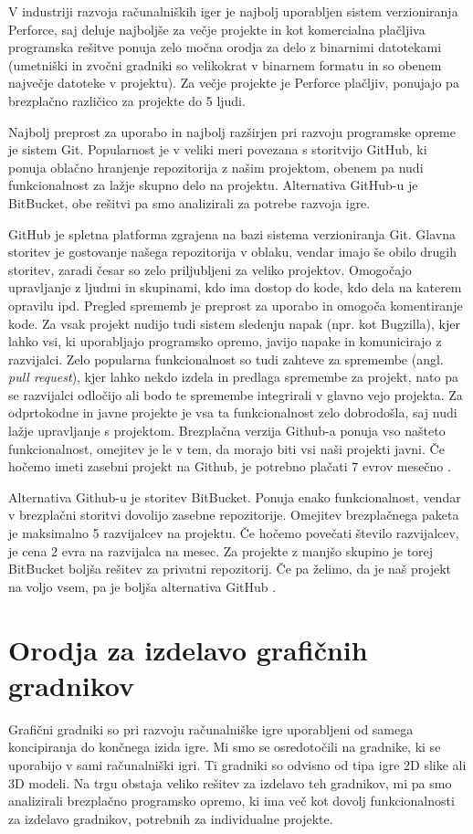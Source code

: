 \documentclass[12pt,a4paper,twoside]{book}
\begin{document}
V industriji razvoja računalniških iger je najbolj uporabljen sistem verzioniranja Perforce, saj deluje najboljše za večje projekte in kot komercialna plačljiva programska rešitve ponuja zelo močna orodja za delo z binarnimi datotekami (umetniški in zvočni gradniki so velikokrat v binarnem formatu in so obenem največje datoteke v projektu). Za večje projekte je Perforce plačljiv, ponujajo pa brezplačno različico za projekte do 5 ljudi.

Najbolj preprost za uporabo in najbolj razširjen pri razvoju programske opreme je sistem Git. Popularnost je v veliki meri povezana s storitvijo GitHub, ki ponuja oblačno hranjenje repozitorija z našim projektom, obenem pa nudi funkcionalnost za lažje skupno delo na projektu. Alternativa GitHub-u je BitBucket, obe rešitvi pa smo analizirali za potrebe razvoja igre.

GitHub je spletna platforma zgrajena na bazi sistema verzioniranja Git. Glavna storitev je gostovanje našega repozitorija v oblaku, vendar imajo še obilo drugih storitev, zaradi česar so zelo priljubljeni za veliko projektov. Omogočajo upravljanje z ljudmi in skupinami, kdo ima dostop do kode, kdo dela na katerem opravilu ipd. Pregled sprememb je preprost za uporabo in omogoča komentiranje kode. Za vsak projekt nudijo tudi sistem sledenju napak (npr. kot Bugzilla), kjer lahko vsi, ki uporabljajo programsko opremo, javijo napake in komunicirajo z razvijalci. Zelo popularna funkcionalnost so tudi zahteve za spremembe (angl. \textit{pull request}), kjer lahko nekdo izdela in predlaga spremembe za projekt, nato pa se razvijalci odločijo ali bodo te spremembe integrirali v glavno vejo projekta. Za odprtokodne in javne projekte je vsa ta funkcionalnost zelo dobrodošla, saj nudi lažje upravljanje s projektom. Brezplačna verzija Github-a ponuja vso našteto funkcionalnost, omejitev je le v tem, da morajo biti vsi naši projekti javni. Če hočemo imeti zasebni projekt na Github, je potrebno plačati 7 evrov mesečno \cite{github}.

Alternativa Github-u je storitev BitBucket. Ponuja enako funkcionalnost, vendar v brezplačni storitvi dovolijo zasebne repozitorije. Omejitev brezplačnega paketa je maksimalno 5 razvijalcev na projektu. Če hočemo povečati število razvijalcev, je cena 2 evra na razvijalca na mesec. Za projekte z manjšo skupino je torej BitBucket boljša rešitev za privatni repozitorij. Če pa želimo, da je naš projekt na voljo vsem, pa je boljša alternativa GitHub \cite{bitBucket}.

\section{Orodja za izdelavo grafičnih gradnikov}
Grafični gradniki so pri razvoju računalniške igre uporabljeni od samega koncipiranja do končnega izida igre. Mi smo se osredotočili na gradnike, ki se uporabijo v sami računalniški igri. Ti gradniki so odvisno od tipa igre 2D slike ali 3D modeli. Na trgu obstaja veliko rešitev za izdelavo teh gradnikov, mi pa smo analizirali brezplačno programsko opremo, ki ima več kot dovolj funkcionalnosti za izdelavo gradnikov, potrebnih za individualne projekte.
\end{document}
